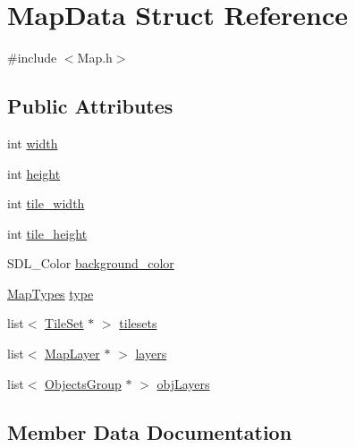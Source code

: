 \hypertarget{struct_map_data}{}\section{Map\+Data Struct Reference}
\label{struct_map_data}


{\ttfamily \#include $<$Map.\+h$>$}

\subsection*{Public Attributes}
\begin{DoxyCompactItemize}
\item 
int \mbox{\hyperlink{struct_map_data_aae704f6b63b93580ab8affdbccc79dd0}{width}}
\item 
int \mbox{\hyperlink{struct_map_data_af1612b683f39f06a1bc725d0b702401d}{height}}
\item 
int \mbox{\hyperlink{struct_map_data_a6f93b7da40452777726e9441b6c941e7}{tile\+\_\+width}}
\item 
int \mbox{\hyperlink{struct_map_data_ac37958e1aa91539893ac9cfead82da17}{tile\+\_\+height}}
\item 
S\+D\+L\+\_\+\+Color \mbox{\hyperlink{struct_map_data_a3d9af3aa3f77d6544368ca7d04e2d71e}{background\+\_\+color}}
\item 
\mbox{\hyperlink{_map_8h_a28c252fd678ff644cdad7b1b835f24c9}{Map\+Types}} \mbox{\hyperlink{struct_map_data_a766a4abeba6b2e2e51be1a4ca1539306}{type}}
\item 
list$<$ \mbox{\hyperlink{struct_tile_set}{Tile\+Set}} $\ast$ $>$ \mbox{\hyperlink{struct_map_data_a5d5439da88d6b7c15739837cf9e6258c}{tilesets}}
\item 
list$<$ \mbox{\hyperlink{struct_map_layer}{Map\+Layer}} $\ast$ $>$ \mbox{\hyperlink{struct_map_data_ae15b869e48141313fd4badc023d0b037}{layers}}
\item 
list$<$ \mbox{\hyperlink{struct_objects_group}{Objects\+Group}} $\ast$ $>$ \mbox{\hyperlink{struct_map_data_aa83f7425059e1d1268abc71eb734559a}{obj\+Layers}}
\end{DoxyCompactItemize}


\subsection{Member Data Documentation}
\mbox{\label{struct_map_data_a3d9af3aa3f77d6544368ca7d04e2d71e}} 
